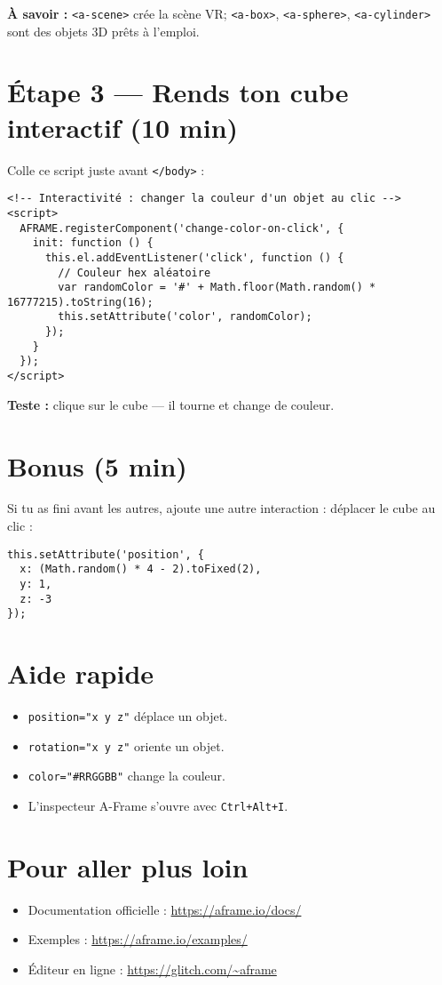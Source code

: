 \documentclass[12pt]{article}
\begin{document}
\textbf{À savoir :} \texttt{<a-scene>} crée la scène VR; \texttt{<a-box>}, \texttt{<a-sphere>}, \texttt{<a-cylinder>} sont des objets 3D prêts à l'emploi.

\section{Étape 3 — Rends ton cube interactif (10 min)}
Colle ce script juste avant \texttt{</body>} :

\begin{verbatim}
<!-- Interactivité : changer la couleur d'un objet au clic -->
<script>
  AFRAME.registerComponent('change-color-on-click', {
    init: function () {
      this.el.addEventListener('click', function () {
        // Couleur hex aléatoire
        var randomColor = '#' + Math.floor(Math.random() * 16777215).toString(16);
        this.setAttribute('color', randomColor);
      });
    }
  });
</script>
\end{verbatim}

\textbf{Teste :} clique sur le cube — il tourne et change de couleur.

\section{Bonus (5 min)}
Si tu as fini avant les autres, ajoute une autre interaction : déplacer le cube au clic :

\begin{verbatim}
this.setAttribute('position', {
  x: (Math.random() * 4 - 2).toFixed(2),
  y: 1,
  z: -3
});
\end{verbatim}

\section*{Aide rapide}
\begin{itemize}
  \item \texttt{position="x y z"} déplace un objet.
  \item \texttt{rotation="x y z"} oriente un objet.
  \item \texttt{color="\#RRGGBB"} change la couleur.
  \item L'inspecteur A-Frame s'ouvre avec \texttt{Ctrl+Alt+I}.
\end{itemize}

\section*{Pour aller plus loin}
\begin{itemize}
  \item Documentation officielle : \url{https://aframe.io/docs/}
  \item Exemples : \url{https://aframe.io/examples/}
  \item Éditeur en ligne : \url{https://glitch.com/~aframe}
\end{itemize}
\end{document}

